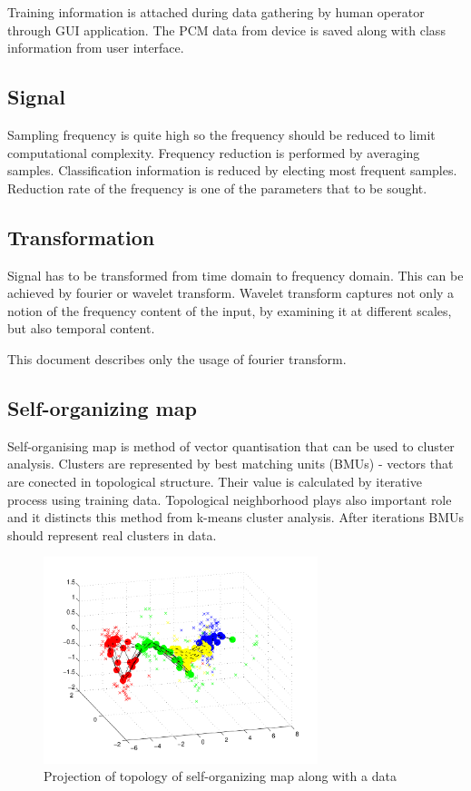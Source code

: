 \documentclass[a4paper,journal]{IEEEtran}
\begin{document}
Training information is attached during data gathering by human operator 
through GUI application.
The PCM data from device is saved along with class information from
user interface.


\subsection{Signal}

Sampling frequency is quite high so the frequency should be reduced to limit
computational complexity. Frequency reduction is performed
by averaging samples. Classification information is reduced by electing
most frequent samples. Reduction rate of the frequency is one of the 
parameters that to be sought.

\subsection{Transformation}
Signal has to be transformed from time domain to frequency domain.
This can be achieved by fourier or wavelet transform.
Wavelet transform
captures not only a notion of the frequency content of the input,
by examining it at different scales, but also temporal content.

This document describes only the usage of fourier transform.



\subsection{Self-organizing map}
Self-organising map is method of vector quantisation that can be used to 
cluster analysis. Clusters are represented by best matching units (BMUs)
- vectors that are conected in topological structure. Their value is calculated
by iterative process using training data. Topological neighborhood plays 
also important role and it distincts this method from k-means cluster analysis.
After iterations BMUs should represent real clusters in data.

\begin{figure}[h]
\centering
\includegraphics[width=80mm]{som_topol_proj}
\caption{Projection of topology of self-organizing map along with a data}
\label{som_topol_proj}
\end{figure}
\end{document}
